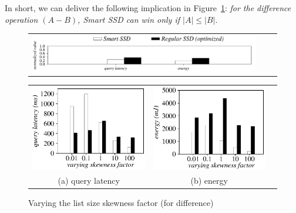 In short, we can deliver the following implication in Figure~\ref{fig:varyListSkewDifference}: \emph{for the \textsf{difference} operation $(A-B)$, Smart SSD can win only if $|A| \le |B|$}.

\begin{figure}[tbp]
  \centering
    \begin{tabular}{ccc}
 \includegraphics[width=0.52\columnwidth]{figures/banner2.pdf}%
\end{tabular}
\vspace{-0.1cm}
\renewcommand{\tabcolsep}{0.1mm}


  \begin{tabular}{ccc}
 \includegraphics[width=0.5\columnwidth]{figures/Difference-time-VaryListSkew.eps}&
  \includegraphics[width=0.5\columnwidth]{figures/Difference-energy-VaryListSkew.eps}\\
  (a) query latency & (b) energy
\end{tabular}

  \caption{Varying the list size skewness factor (for difference)}
  \label{fig:varyListSkewDifference}
 \end{figure}


